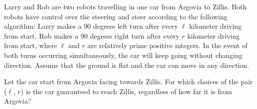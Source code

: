 Larry and Rob are two robots travelling in one car from Argovia to Zillis. Both robots have control over the steering and steer according to the following algorithm: Larry makes a 90 degrees left turn after every $ \ell$ kilometer driving from start, Rob makes a 90 degrees right turn after every $ r$ kilometer driving from start, where $ \ell$ and $ r$ are relatively prime positive integers. In the event of both turns occurring simultaneously, the car will keep going without changing direction. Assume that the ground is flat and the car can move in any direction.

Let the car start from Argovia facing towards Zillis. For which choices of the pair ($ \ell$, $ r$) is the car guaranteed to reach Zillis, regardless of how far it is from Argovia?